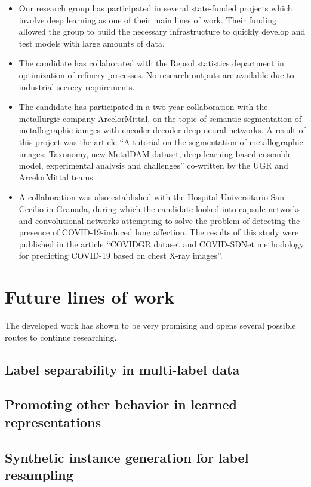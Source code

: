 \begin{itemize}
    \item Our research group has participated in several state-funded projects which involve deep learning as one of their main lines of work. Their funding allowed the group to build the necessary infrastructure to quickly develop and test models with large amounts of data.
    \item The candidate has collaborated with the Repsol statistics department in optimization of refinery processes. No research outputs are available due to industrial secrecy requirements.
    \item The candidate has participated in a two-year collaboration with the metallurgic company ArcelorMittal, on the topic of semantic segmentation of metallographic iamges with encoder-decoder deep neural networks. A result of this project was the article ``A tutorial on the segmentation of metallographic images: Taxonomy, new MetalDAM dataset, deep learning-based ensemble model, experimental analysis and challenges'' co-written by the UGR and ArcelorMittal teams.
    \item A collaboration was also established with the Hospital Universitario San Cecilio in Granada, during which the candidate looked into capsule networks and convolutional networks attempting to solve the problem of detecting the presence of COVID-19-induced lung affection. The results of this study were published in the article ``COVIDGR dataset and COVID-SDNet methodology for predicting COVID-19 based on chest X-ray images''.
\end{itemize}

\section{Future lines of work}

The developed work has shown to be very promising and opens several possible routes to continue researching. 

\subsection{Label separability in multi-label data}

\subsection{Promoting other behavior in learned representations}

\subsection{Synthetic instance generation for label resampling}

